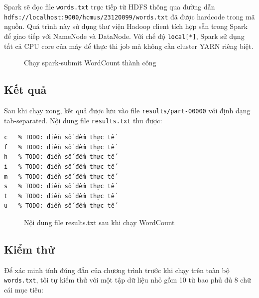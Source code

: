 \documentclass[12pt]{article}
\begin{document}
Spark sẽ đọc file \texttt{words.txt} trực tiếp từ HDFS thông qua đường dẫn
\texttt{hdfs://localhost:9000/hcmus/23120099/words.txt} đã được hardcode trong mã
nguồn. Quá trình này sử dụng thư viện Hadoop client tích hợp sẵn trong Spark để
giao tiếp với NameNode và DataNode. Với chế độ \texttt{local[*]}, Spark sử dụng
tất cả CPU core của máy để thực thi job mà không cần cluster YARN riêng biệt.

\begin{figure}[H]
  \centering
  \caption{Chạy spark-submit WordCount thành công}
  \label{fig:spark-submit}
\end{figure}

\subsection{Kết quả}

Sau khi chạy xong, kết quả được lưu vào file \texttt{results/part-00000} với định
dạng tab-separated. Nội dung file \texttt{results.txt} thu được:

\begin{verbatim}
c	% TODO: điền số đếm thực tế
f	% TODO: điền số đếm thực tế
h	% TODO: điền số đếm thực tế
i	% TODO: điền số đếm thực tế
m	% TODO: điền số đếm thực tế
s	% TODO: điền số đếm thực tế
t	% TODO: điền số đếm thực tế
u	% TODO: điền số đếm thực tế
\end{verbatim}

\begin{figure}[H]
  \centering
  \caption{Nội dung file results.txt sau khi chạy WordCount}
  \label{fig:results}
\end{figure}

\subsection{Kiểm thử}

Để xác minh tính đúng đắn của chương trình trước khi chạy trên toàn bộ
\texttt{words.txt}, tôi tự kiểm thử với một tập dữ liệu nhỏ gồm 10 từ bao phủ
đủ 8 chữ cái mục tiêu:
\end{document}

